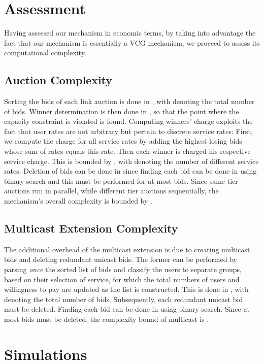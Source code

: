 \documentclass[a4paper]{article}
\begin{document}
\section{Assessment}\label{sec:assessment}

Having assessed our mechanism in economic terms, by taking into advantage 
the fact that our mechanism is essentially a VCG mechanism, we proceed to 
assess its computational complexity.

\subsection{Auction Complexity}
Sorting the bids of each link auction is done in , with  denoting 
the total number of bids. Winner determination is then done in , so that the
point where the capacity constraint is violated is found. 
Computing winners' charge exploits the fact that user rates are not arbitrary but
pertain to discrete service rates: First, we compute the charge for all
service rates by adding the highest losing bids whose sum of rates equals this rate. 
Then each winner is charged his respective service charge. 
This
is bounded by , with  denoting the number of different service rates.
Deletion of bids can be done in  since finding each bid can be done in 
 using binary search and this must be performed for at most  bids.
Since same-tier auctions run in parallel, while different tier auctions sequentially, 
the mechanism's overall complexity is bounded by 
.

\subsection{Multicast Extension Complexity}
The additional overhead of the multicast extension is due to creating
multicast bids and deleting redundant unicast bids. The former can be
performed 
by parsing {\em once} the sorted list of bids and
classify the users to separate groups, based on their selection of service,
for which the total numbers of users and willingness to pay are updated 
as the list is constructed. This is done in , with  denoting the 
total number of bids. Subsequently, each redundant unicast bid must be 
deleted. Finding each bid can be done in  using binary search. 
Since at most  bids must be deleted, the complexity bound of 
multicast is .
 
\section{Simulations}\label{sec:sims}
\end{document}
